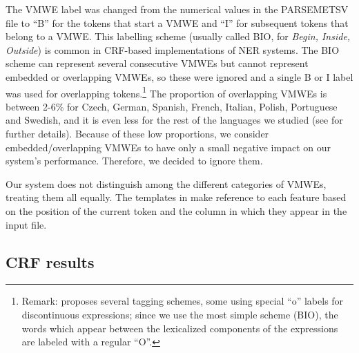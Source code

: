 \documentclass[output=paper
,modfonts
,nonflat]{langsci/langscibook}
\begin{document}
The VMWE label was changed from the
numerical values in the PARSEMETSV file to ``B'' for the tokens that
start a VMWE and ``I'' for subsequent tokens that belong to a
VMWE. This labelling scheme (usually called BIO, for {\em Begin,
Inside, Outside}) is common in CRF-based implementations of
NER systems. The BIO scheme can represent several
consecutive VMWEs but cannot represent embedded or overlapping VMWEs, so
these were ignored and a single B or I label was used for overlapping
tokens.\footnote{Remark: \cite{Schneider14b} proposes several tagging schemes, some using special ``o'' labels for discontinuous expressions; since we use the most simple scheme (BIO), the words which appear between the lexicalized components of the expressions are labeled with a regular ``O''.} %
The proportion of overlapping VMWEs is between 2-6\% for Czech, German, Spanish, French, Italian, Polish, Portuguese and Swedish,
and it is even less for the rest of the languages we studied (see  for further details).
Because of these low proportions, we consider embedded/overlapping VMWEs to have only a small negative impact on our system's performance. Therefore, we decided to ignore them.

Our system does not distinguish among the different categories of VMWEs, treating them all equally. The templates in
 make reference to each feature based on
the position of the current token and the column in which they appear
in the input file.

\subsection{CRF results}

\end{document}
